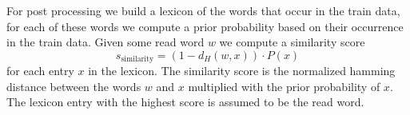 For post processing we build a lexicon of the words that occur in the train data, for each of these words we compute a prior probability based on their occurrence in the train data. Given some read word $w$ we compute a similarity score
\begin{equation}
	s_{\text{similarity}} = (1 - d_H(w, x)) \cdot P(x)
\end{equation}
for each entry $x$ in the lexicon. The similarity score is the normalized hamming distance between the words $w$ and $x$ multiplied with the prior probability of $x$. The lexicon entry with the highest score is assumed to be the read word.